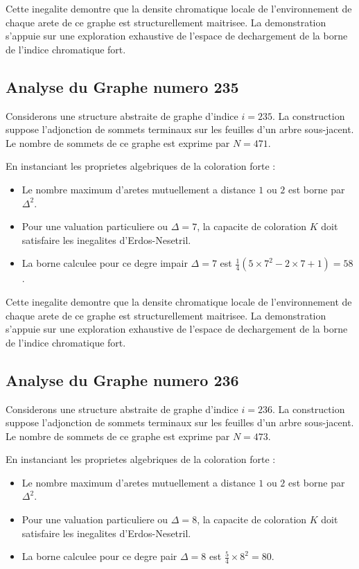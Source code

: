 \documentclass[11pt,a4paper]{article}
\begin{document}
Cette inegalite demontre que la densite chromatique locale de l'environnement de chaque arete de ce graphe est structurellement maitrisee. La demonstration s'appuie sur une exploration exhaustive de l'espace de dechargement de la borne de l'indice chromatique fort.

\subsection{Analyse du Graphe numero 235}
Considerons une structure abstraite de graphe d'indice $i = 235$. La construction suppose l'adjonction de sommets terminaux sur les feuilles d'un arbre sous-jacent. Le nombre de sommets de ce graphe est exprime par $N = 471$.

En instanciant les proprietes algebriques de la coloration forte :
\begin{itemize}
\item Le nombre maximum d'aretes mutuellement a distance $1$ ou $2$ est borne par $\Delta^2$.
\item Pour une valuation particuliere ou $\Delta = 7$, la capacite de coloration $K$ doit satisfaire les inegalites d'Erdos-Nesetril.
\item La borne calculee pour ce degre impair $\Delta = 7$ est $\frac{1}{4}(5 \times 7^2 - 2 \times 7 + 1) = 58$.
\end{itemize}

Cette inegalite demontre que la densite chromatique locale de l'environnement de chaque arete de ce graphe est structurellement maitrisee. La demonstration s'appuie sur une exploration exhaustive de l'espace de dechargement de la borne de l'indice chromatique fort.

\subsection{Analyse du Graphe numero 236}
Considerons une structure abstraite de graphe d'indice $i = 236$. La construction suppose l'adjonction de sommets terminaux sur les feuilles d'un arbre sous-jacent. Le nombre de sommets de ce graphe est exprime par $N = 473$.

En instanciant les proprietes algebriques de la coloration forte :
\begin{itemize}
\item Le nombre maximum d'aretes mutuellement a distance $1$ ou $2$ est borne par $\Delta^2$.
\item Pour une valuation particuliere ou $\Delta = 8$, la capacite de coloration $K$ doit satisfaire les inegalites d'Erdos-Nesetril.
\item La borne calculee pour ce degre pair $\Delta = 8$ est $\frac{5}{4} \times 8^2 = 80$.
\end{itemize}
\end{document}
